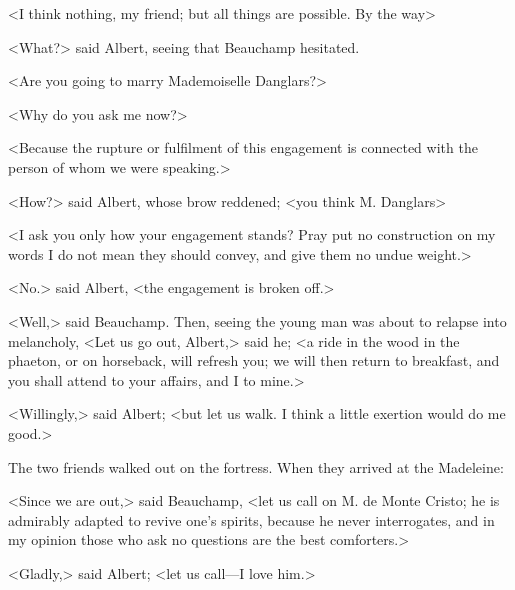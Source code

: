  <I think nothing, my friend; but all things are possible. By the way\longdash> 

 <What?> said Albert, seeing that Beauchamp hesitated. 

 <Are you going to marry Mademoiselle Danglars?> 

 <Why do you ask me now?> 

 <Because the rupture or fulfilment of this engagement is connected with the person of whom we were speaking.> 

 <How?> said Albert, whose brow reddened; <you think M. Danglars\longdash> 

 <I ask you only how your engagement stands? Pray put no construction on my words I do not mean they should convey, and give them no undue weight.> 

 <No.> said Albert, <the engagement is broken off.> 

 <Well,> said Beauchamp. Then, seeing the young man was about to relapse into melancholy, <Let us go out, Albert,> said he; <a ride in the wood in the phaeton, or on horseback, will refresh you; we will then return to breakfast, and you shall attend to your affairs, and I to mine.> 

 <Willingly,> said Albert; <but let us walk. I think a little exertion would do me good.> 

 The two friends walked out on the fortress. When they arrived at the Madeleine: 

 <Since we are out,> said Beauchamp, <let us call on M. de Monte Cristo; he is admirably adapted to revive one's spirits, because he never interrogates, and in my opinion those who ask no questions are the best comforters.> 

 <Gladly,> said Albert; <let us call—I love him.> 